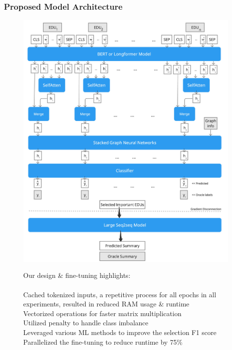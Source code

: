 \documentclass{beamer}
\begin{document}

\begin{frame}
\frametitle{Proposed Model Architecture}

\begin{figure}[ht]
    \centering
    \begin{minipage}{0.6\textwidth}
            \includegraphics[scale=.05]{imgs/MyModelOverview.jpg}
            \end{minipage}\hfill
    \begin{minipage}{0.4\textwidth}
    \footnotesize
     Our design \& fine-tuning highlights:\\\\
     \textbullet\: Cached tokenized inputs, a repetitive process for all epochs in all experiments, resulted in reduced RAM usage \& runtime\\
     \textbullet\: Vectorized operations for faster matrix multiplication \\
     \textbullet\: Utilized penalty to handle class imbalance \\
    \textbullet\: Leveraged various ML methods to improve the selection F1 score \\
    \textbullet\: Parallelized the fine-tuning to reduce runtime by 75\% \\


\end{minipage}
\end{figure}
\end{frame}
\end{document}
